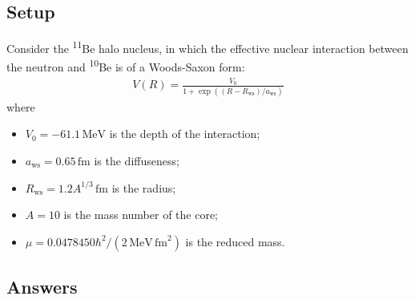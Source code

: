 \documentclass[fleqn, 12pt]{article}
\begin{document}
\subsection*{Setup}

Consider the \textsuperscript{11}Be halo nucleus, in which the effective
nuclear interaction between the neutron and \textsuperscript{10}Be is of a
Woods-Saxon form:
\begin{align*}
V(R) = \frac{V_0}{1 + \exp((R - R_{\text{ws}}) / a_{\text{ws}})}
\end{align*}
where
\begin{itemize}
\item $V_0 = -61.1\,\mathrm{MeV}$ is the depth of the interaction;
\item $a_{\text{ws}} = 0.65\,\mathrm{fm}$ is the diffuseness;
\item $R_{\text{ws}} = 1.2 A^{1/3}\,\mathrm{fm}$ is the radius;
\item $A = 10$ is the mass number of the core;
\item $\mu = 0.0478450 \hbar^2 / (2\,\mathrm{MeV}\,\mathrm{fm}^2)$
  is the reduced mass.
\end{itemize}

\subsection*{Answers}
\end{document}
